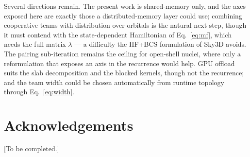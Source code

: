 \documentclass[preprint,12pt]{elsarticle}
\numberwithin{equation}{section}
\begin{document}
Several directions remain. The present work is shared-memory only, and the axes exposed here are exactly those a distributed-memory layer could use; combining cooperative teams with distribution over orbitals is the natural next step, though it must contend with the state-dependent Hamiltonian of Eq.~\eqref{eq:mf}, which needs the full matrix $\lambda$ --- a difficulty the HF+BCS formulation of Sky3D avoids. The pairing sub-iteration remains the ceiling for open-shell nuclei, where only a reformulation that exposes an axis in the recurrence would help. GPU offload suits the slab decomposition and the blocked kernels, though not the recurrence; and the team width could be chosen automatically from runtime topology through Eq.~\eqref{eq:width}.

\section*{Acknowledgements}
[To be completed.]
\end{document}
